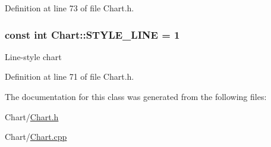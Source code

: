 \-Definition at line 73 of file \-Chart.\-h.

\hypertarget{class_chart_a188d5bd4cd6898300be57056f79f55ba}{
\subsubsection[{\-S\-T\-Y\-L\-E\-\_\-\-L\-I\-N\-E}]{\setlength{\rightskip}{0pt plus 5cm}const int {\bf \-Chart\-::\-S\-T\-Y\-L\-E\-\_\-\-L\-I\-N\-E} = 1}}
\label{class_chart_a188d5bd4cd6898300be57056f79f55ba}
\-Line-\/style chart 

\-Definition at line 71 of file \-Chart.\-h.



\-The documentation for this class was generated from the following files\-:\begin{DoxyCompactItemize}
\item 
\-Chart/\hyperlink{_chart_8h}{\-Chart.\-h}\item 
\-Chart/\hyperlink{_chart_8cpp}{\-Chart.\-cpp}\end{DoxyCompactItemize}
